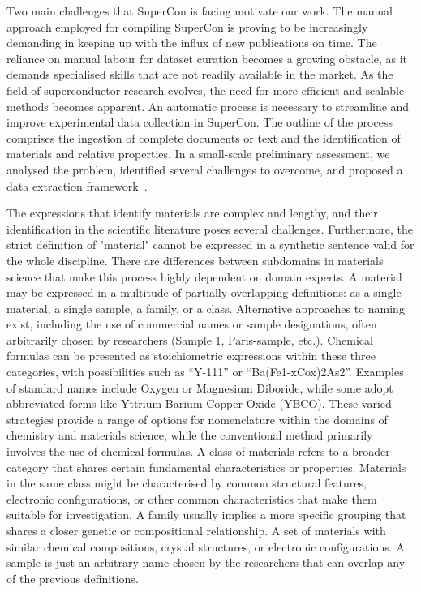 Two main challenges that SuperCon is facing motivate our work. 
The manual approach employed for compiling SuperCon is proving to be increasingly demanding in keeping up with the influx of new publications on time. The reliance on manual labour for dataset curation becomes a growing obstacle, as it demands specialised skills that are not readily available in the market. As the field of superconductor research evolves, the need for more efficient and scalable methods becomes apparent.
An automatic process is necessary to streamline and improve experimental data collection in SuperCon. 
The outline of the process comprises the ingestion of complete documents or text and the identification of materials and relative properties.  
In a small-scale preliminary assessment, we analysed the problem, identified several challenges to overcome, and proposed a data extraction framework~\cite{foppiano2019proposal}.

The expressions that identify materials are complex and lengthy, and their identification in the scientific literature poses several challenges.
Furthermore, the strict definition of "material" cannot be expressed in a synthetic sentence valid for the whole discipline. There are differences between subdomains in materials science that make this process highly dependent on domain experts.
A material may be expressed in a multitude of partially overlapping definitions: as a single material, a single sample, a family, or a class.
Alternative approaches to naming exist, including the use of commercial names or sample designations, often arbitrarily chosen by researchers (Sample 1, Paris-sample, etc.). Chemical formulas can be presented as stoichiometric expressions within these three categories, with possibilities such as ``Y-111'' or ``Ba(Fe1-xCox)2As2''. Examples of standard names include Oxygen or Magnesium Diboride, while some adopt abbreviated forms like Yttrium Barium Copper Oxide (YBCO). These varied strategies provide a range of options for nomenclature within the domains of chemistry and materials science, while the conventional method primarily involves the use of chemical formulas.
A class of materials refers to a broader category that shares certain fundamental characteristics or properties. Materials in the same class might be characterised by common structural features, electronic configurations, or other common characteristics that make them suitable for investigation. 
A family usually implies a more specific grouping that shares a closer genetic or compositional relationship. A set of materials with similar chemical compositions, crystal structures, or electronic configurations. 
A sample is just an arbitrary name chosen by the researchers that can overlap any of the previous definitions. 

